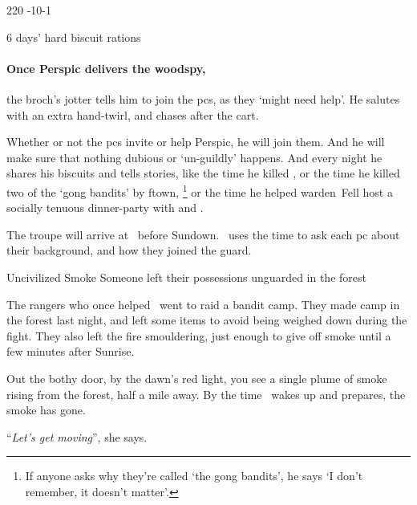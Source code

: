 \documentclass[10pt,twoside]{book}
\begin{document}
%
  {{2}{2}{0}}%
  {{-1}{0}{-1}}%
  {
      \partialchain
      \addtocounter{fp}{5}
      \glaive
  }%
  {}%
  {6 days' hard biscuit rations}%
  {}%

\paragraph{Once Perspic delivers the \gls{woodspy},}
the \gls{broch}'s \gls{jotter} tells him to join the \glspl{pc}, as they `might need help'.
He salutes with an extra hand-twirl, and chases after the cart.

Whether or not the \glspl{pc} invite or help Perspic, he will join them.
And he will make sure that nothing dubious or `un-guildly' happens.
And every night he shares his biscuits and tells stories, like the time he killed , or the time he killed two of the `gong bandits' by \gls{ftown},%
\footnote{If anyone asks why they're called `the gong bandits', he says `I don't remember, it doesn't matter'.}
or the time he helped \Gls{warden}~Fell host a socially tenuous dinner-party with  and .

The troupe will arrive at \bothyOne\ before Sundown.
\marketFence\ uses the time to ask each \gls{pc} about their background, and how they joined the \gls{guard}.

{Uncivilized Smoke}%
{Someone left their possessions unguarded in the forest}%
\label{rangerCamp}

\begin{exampletext}
  The \glspl{ranger} who once helped \marketFence\ went to raid a bandit camp.
  They made camp in the forest last night, and left some items to avoid being weighed down during the fight.
  They also left the fire smouldering, just enough to give off smoke until a few minutes after Sunrise.
\end{exampletext}

\begin{boxtext}
  Out the \gls{bothy} door, by the dawn's red light, you see a single plume of smoke rising from the forest, half a mile away.
  By the time \marketFence\ wakes up and prepares, the smoke has gone.

  ``\textit{Let's get moving}'', she says.
\end{boxtext}
\end{document}
